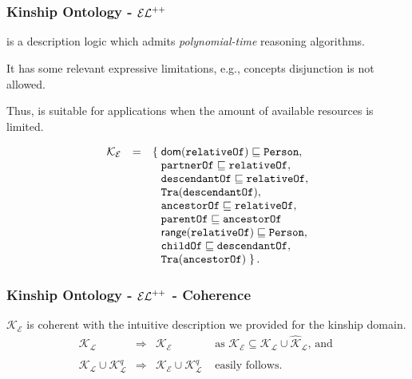 \documentclass[8pt]{beamer}
\newcommand{\Persons}{\mathtt{Person}}
\newcommand{\relative}{\mathtt{relativeOf}}
\newcommand{\partner}{\mathtt{partnerOf}}
\newcommand{\child}{\mathtt{childOf}}
\newcommand{\parent}{\mathtt{parentOf}}
\newcommand{\ancestor}{\mathtt{ancestorOf}}
\newcommand{\descendant}{\mathtt{descendantOf}}
\newcommand{\KBsets}{\mathcal{K}_{\mathcal{L}}}
\newcommand{\KBlcons}{\widehat{\mathcal{K}}_{\mathcal{L}}}
\newcommand{\KBsetsq}{\mathcal{K}^{q}_\mathcal{L}}
\newcommand{\KBel}{\mathcal{K_E}}
\begin{document}
\section{\elplusplus}
\begin{frame}
\frametitle{Kinship Ontology - $\mathcal{EL}^{++}$}
\elplusplus is a description logic which admits \emph{polynomial-time} reasoning algorithms.
\vspace{\baselineskip}

It has some relevant expressive limitations, e.g., concepts disjunction is not allowed.
\vspace{\baselineskip}

Thus, \elplusplus is suitable for applications when the amount of available resources is
limited.
\vspace{\baselineskip}

\begin{center}
\begin{small}
\[
 \begin{array}{rcl}
  \KBel& = & \{\; \dom(\relative) \Issub \Persons,\\
  && \phantom{\{\;} \partner\Issub\relative,  \\
  && \phantom{\{\;} \descendant\Issub\relative,\\
  && \phantom{\{\;} \istransitive{\descendant},\\
  && \phantom{\{\;} \ancestor\Issub\relative,\\
  && \phantom{\{\;} \parent\Issub\ancestor \\  
  && \phantom{\{\;} \range(\relative) \Issub \Persons,\\
  && \phantom{\{\;} \child\Issub\descendant,\\
  && \phantom{\{\;} \istransitive{\ancestor} \;\}\,.
 \end{array}
\]
\end{small}%
\end{center}
\end{frame}

\begin{frame}
\frametitle{Kinship Ontology - $\mathcal{EL}^{++}$ - Coherence}
$\KBel$ is coherent with the intuitive description we provided for the kinship domain.
\[
\begin{array}{cccl}
 \KBsets &\Longrightarrow& \KBel & \mbox{ as } \KBel \subseteq \KBsets \cup \KBlcons\mbox{, and }\\
 &&&\\
 \KBsets \cup \KBsetsq & \Longrightarrow & \KBel \cup \KBsetsq & \mbox{ easily follows.}
\end{array} 
\]
\end{frame}
\end{document}
